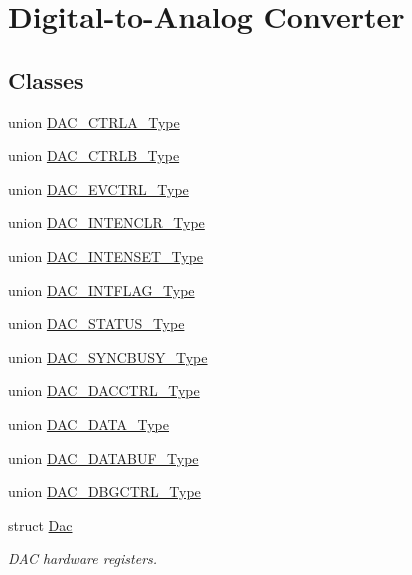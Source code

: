 \hypertarget{group___s_a_m_l21___d_a_c}{}\section{Digital-\/to-\/\+Analog Converter}
\label{group___s_a_m_l21___d_a_c}
\subsection*{Classes}
\begin{DoxyCompactItemize}
\item 
union \hyperlink{union_d_a_c___c_t_r_l_a___type}{D\+A\+C\+\_\+\+C\+T\+R\+L\+A\+\_\+\+Type}
\item 
union \hyperlink{union_d_a_c___c_t_r_l_b___type}{D\+A\+C\+\_\+\+C\+T\+R\+L\+B\+\_\+\+Type}
\item 
union \hyperlink{union_d_a_c___e_v_c_t_r_l___type}{D\+A\+C\+\_\+\+E\+V\+C\+T\+R\+L\+\_\+\+Type}
\item 
union \hyperlink{union_d_a_c___i_n_t_e_n_c_l_r___type}{D\+A\+C\+\_\+\+I\+N\+T\+E\+N\+C\+L\+R\+\_\+\+Type}
\item 
union \hyperlink{union_d_a_c___i_n_t_e_n_s_e_t___type}{D\+A\+C\+\_\+\+I\+N\+T\+E\+N\+S\+E\+T\+\_\+\+Type}
\item 
union \hyperlink{union_d_a_c___i_n_t_f_l_a_g___type}{D\+A\+C\+\_\+\+I\+N\+T\+F\+L\+A\+G\+\_\+\+Type}
\item 
union \hyperlink{union_d_a_c___s_t_a_t_u_s___type}{D\+A\+C\+\_\+\+S\+T\+A\+T\+U\+S\+\_\+\+Type}
\item 
union \hyperlink{union_d_a_c___s_y_n_c_b_u_s_y___type}{D\+A\+C\+\_\+\+S\+Y\+N\+C\+B\+U\+S\+Y\+\_\+\+Type}
\item 
union \hyperlink{union_d_a_c___d_a_c_c_t_r_l___type}{D\+A\+C\+\_\+\+D\+A\+C\+C\+T\+R\+L\+\_\+\+Type}
\item 
union \hyperlink{union_d_a_c___d_a_t_a___type}{D\+A\+C\+\_\+\+D\+A\+T\+A\+\_\+\+Type}
\item 
union \hyperlink{union_d_a_c___d_a_t_a_b_u_f___type}{D\+A\+C\+\_\+\+D\+A\+T\+A\+B\+U\+F\+\_\+\+Type}
\item 
union \hyperlink{union_d_a_c___d_b_g_c_t_r_l___type}{D\+A\+C\+\_\+\+D\+B\+G\+C\+T\+R\+L\+\_\+\+Type}
\item 
struct \hyperlink{struct_dac}{Dac}
\begin{DoxyCompactList}\small\item\em D\+A\+C hardware registers. \end{DoxyCompactList}\end{DoxyCompactItemize}
